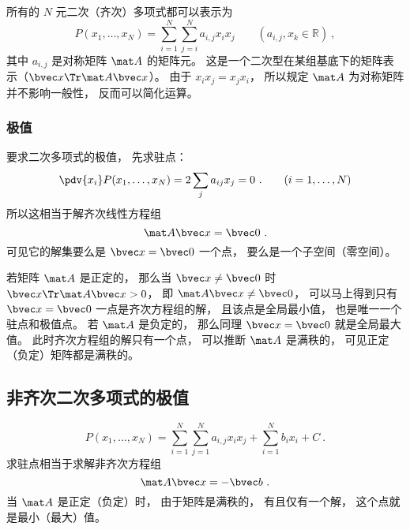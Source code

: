 

所有的 $N$ 元二次（齐次）多项式都可以表示为
\begin{equation}
P(x_1,\dots,x_N) = \sum_{i=1}^N\sum_{j=i}^N a_{i,j}x_i x_j \qquad (a_{i,j}, x_k \in \mathbb R)~,
\end{equation}
其中 $a_{i,j}$ 是对称矩阵 $\mat A$ 的矩阵元。 这是一个二次型在某组基底下的矩阵表示（$\bvec x\Tr \mat A \bvec x$）。 由于 $x_i x_j = x_j x_i$， 所以规定 $\mat A$ 为对称矩阵并不影响一般性， 反而可以简化运算。

\subsubsection{极值}
要求二次多项式的极值， 先求驻点：
\begin{equation}
\pdv{x_i}P(x_1,\dots,x_N) = 2\sum_j a_{ij} x_j = 0 ~.\qquad (i = 1,\dots,N)
\end{equation}
所以这相当于解齐次线性方程组
\begin{equation}
\mat A \bvec x = \bvec 0~.
\end{equation}
可见它的解集要么是 $\bvec x = \bvec 0$ 一个点， 要么是一个子空间（零空间）。

若矩阵 $\mat A$ 是正定的， 那么当 $\bvec x \ne \bvec 0$ 时 $\bvec x\Tr \mat A \bvec x > 0$， 即 $\mat A \bvec x \ne \bvec 0$， 可以马上得到只有 $\bvec x = \bvec 0$ 一点是齐次方程组的解， 且该点是全局最小值， 也是唯一一个驻点和极值点。 若 $\mat A$ 是负定的， 那么同理 $\bvec x = \bvec 0$ 就是全局最大值。 此时齐次方程组的解只有一个点， 可以推断 $\mat A$ 是满秩的， 可见正定（负定）矩阵都是满秩的。

\subsection{非齐次二次多项式的极值}
\begin{equation}
P(x_1,\dots,x_N) = \sum_{i=1}^N\sum_{j=1}^N a_{i,j}x_i x_j + \sum_{i=1}^N b_i x_i + C~.
\end{equation}
求驻点相当于求解非齐次方程组
\begin{equation}
\mat A \bvec x = -\bvec b~.
\end{equation}
当 $\mat A$ 是正定（负定）时， 由于矩阵是满秩的， 有且仅有一个解， 这个点就是最小（最大）值。
